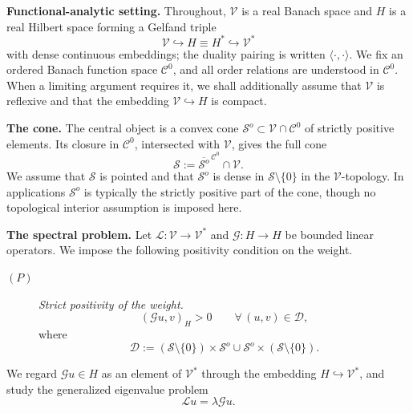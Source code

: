 \documentclass[preprint,10pt]{elsarticle}
\theoremstyle{plain}
\theoremstyle{definition}
\theoremstyle{remark}
\begin{document}
\medskip

\noindent\textbf{Functional-analytic setting.}\;
Throughout, $\mathcal{V}$ is a real Banach space and $H$ is a real Hilbert
space forming a Gelfand triple
\[
\mathcal{V} \hookrightarrow H \equiv H^{*} \hookrightarrow \mathcal{V}^{*}
\]
with dense continuous embeddings; the duality pairing is written
$\langle\cdot,\cdot\rangle$. We fix an ordered Banach function space
$\mathcal{C}^{0}$, and all order relations are understood in $\mathcal{C}^{0}$.
When a limiting argument requires it, we shall additionally assume that
$\mathcal{V}$ is reflexive and that the embedding $\mathcal{V}\hookrightarrow H$
is compact.

\medskip

\noindent\textbf{The cone.}\;
The central object is a convex cone
$\mathcal{S}^{o}\subset\mathcal{V}\cap\mathcal{C}^{0}$ of strictly positive
elements. Its closure in $\mathcal{C}^{0}$, intersected with $\mathcal{V}$,
gives the full cone
\[
\mathcal{S} := \overline{\mathcal{S}^{o}}^{\,\mathcal{C}^{0}}\cap\mathcal{V}.
\]
We assume that $\mathcal{S}$ is pointed and that $\mathcal{S}^{o}$ is dense
in $\mathcal{S}\setminus\{0\}$ in the $\mathcal{V}$-topology. In applications
$\mathcal{S}^{o}$ is typically the strictly positive part of the cone, though
no topological interior assumption is imposed here.

\medskip

\noindent\textbf{The spectral problem.}\;
Let $\mathcal{L}:\mathcal{V}\to\mathcal{V}^{*}$ and $\mathcal{G}:H\to H$ be
bounded linear operators. We impose the following positivity condition on the
weight.

\begin{description}
	\item[$(P)$] \emph{Strict positivity of the weight.}
	\[
	(\mathcal{G}u,v)_H>0
	\qquad
	\forall\,(u,v)\in\mathcal D,
	\]
	where
	\[
	\mathcal D
	:=
	(\mathcal S\setminus\{0\})\times\mathcal S^o
	\cup
	\mathcal S^o\times(\mathcal S\setminus\{0\}).
	\]
\end{description}

We regard $\mathcal G u\in H$ as an element of $\mathcal V^*$ through the
embedding $H\hookrightarrow\mathcal V^*$, and study the generalized
eigenvalue problem
\[
\mathcal{L}u = \lambda\mathcal{G}u.
\]

\medskip
\end{document}
